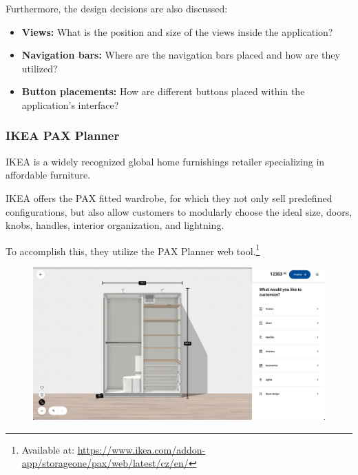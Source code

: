 \break
\noindent Furthermore, the design decisions are also discussed:\nopagebreak
\begin{itemize}[label=\rectanglebullet]
    \item \textbf{Views:} What is the position and size of the views inside the application?
    \item \textbf{Navigation bars:} Where are the navigation bars placed and how are they utilized?
    \item \textbf{Button placements:} How are different buttons placed within the application's interface?
\end{itemize}


\subsubsection{IKEA PAX Planner}

IKEA is a widely recognized global home furnishings retailer specializing in affordable furniture.~\cite{StatistaIkea}

IKEA offers the PAX fitted wardrobe, for which they not only sell predefined configurations, but also allow customers to modularly choose the ideal size, doors, knobs, handles, interior organization, and lightning.~\cite{IkeaPAX}

To accomplish this, they utilize the PAX Planner web tool.\footnote{Available at: \url{https://www.ikea.com/addon-app/storageone/pax/web/latest/cz/en/}}

\begin{figure}[h]
\centering
\includegraphics[width=\textwidth]{images/analysis_ikea-pax.png}
\end{figure}

